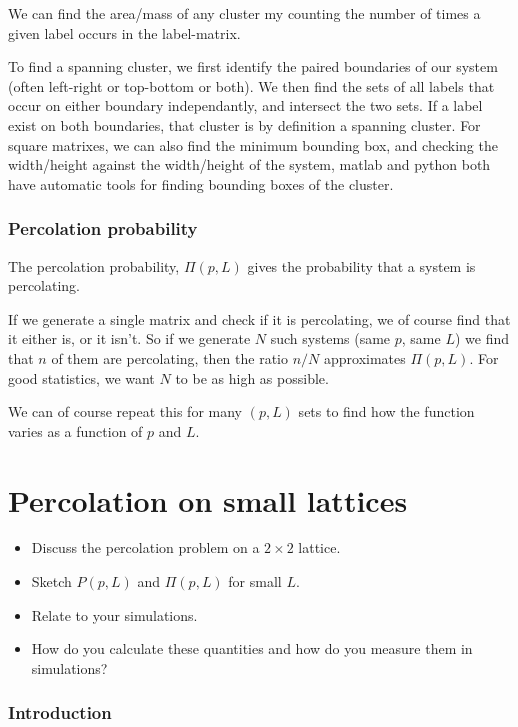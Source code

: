 \documentclass[a4paper, 11pt, notitlepage, english]{article}
\begin{document}
We can find the area/mass of any cluster my counting the number of times a given label occurs in the label-matrix.

To find a spanning cluster, we first identify the paired boundaries of our system (often left-right or top-bottom or both). We then find the sets of all labels that occur on either boundary independantly, and intersect the two sets. If a label exist on both boundaries, that cluster is by definition a spanning cluster. For square matrixes, we can also find the minimum bounding box, and checking the width/height against the width/height of the system, matlab and python both have automatic tools for finding bounding boxes of the cluster.

\subsubsection*{Percolation probability}

The percolation probability, $\Pi(p,L)$ gives the probability that a system is percolating. 

If we generate a single matrix and check if it is percolating, we of course find that it either is, or it isn't. So if we generate $N$ such systems (same $p$, same $L$) we find that $n$ of them are percolating, then the ratio $n/N$ approximates $\Pi(p,L)$. For good statistics, we want $N$ to be as high as possible. 

We can of course repeat this for many $(p, L)$ sets to find how the function varies as a function of $p$ and $L$.


\clearpage


\section{Percolation on small lattices}
\begin{itemize}
	\item Discuss the percolation problem on a $2\times 2$ lattice.
	\item Sketch $P(p, L)$ and $\Pi(p, L)$ for small $L$.
	\item Relate to your simulations.
	\item How do you calculate these quantities and how do you measure them in simulations?
\end{itemize}

   

\subsubsection*{Introduction}
\end{document}
